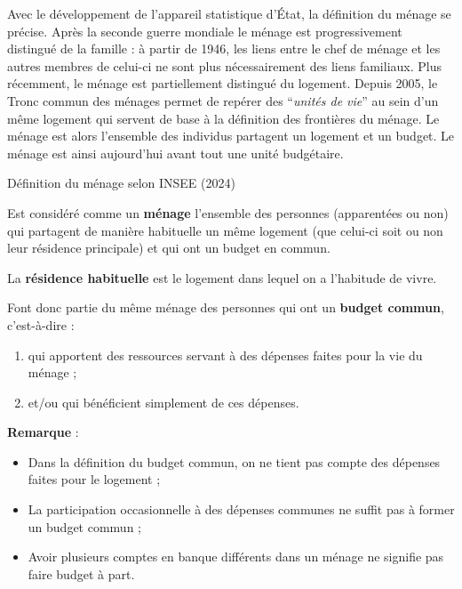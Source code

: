 \documentclass[
  12pt,
]{book}
\begin{document}
Avec le développement de l'appareil statistique d'État, la définition du
ménage se précise. Après la seconde guerre mondiale le ménage est
progressivement distingué de la famille : à partir de 1946, les liens
entre le chef de ménage et les autres membres de celui-ci ne sont plus
nécessairement des liens familiaux. Plus récemment, le ménage est
partiellement distingué du logement. Depuis 2005, le Tronc commun des
ménages permet de repérer des ``\emph{unités de vie}'' au sein d'un même
logement qui servent de base à la définition des frontières du ménage.
Le ménage est alors l'ensemble des individus partagent un logement et un
budget. Le ménage est ainsi aujourd'hui avant tout une unité budgétaire.

\begin{encadre}{Définition du ménage selon INSEE (2024)}

Est considéré comme un \textbf{ménage} l'ensemble des personnes (apparentées ou non) qui partagent de manière habituelle un même logement (que celui-ci soit ou non leur résidence principale) et qui ont un budget en commun.

La \textbf{résidence habituelle} est le logement dans lequel on a l'habitude de vivre.

Font donc partie du même ménage des personnes qui ont un \textbf{budget commun}, c'est-à-dire :

\begin{enumerate}

\item{qui apportent des ressources servant à des dépenses faites pour la vie du ménage ;}

\item{et/ou qui bénéficient simplement de ces dépenses.}

\end{enumerate}

\tcblower

\textbf{Remarque} : 

\begin{itemize}

\item{Dans la définition du budget commun, on ne tient pas compte des dépenses faites pour le logement ;}

\item{La participation occasionnelle à des dépenses communes ne suffit pas à former un budget commun ;}

\item{Avoir plusieurs comptes en banque différents dans un ménage ne signifie pas faire budget à part.}

\end{itemize}

\end{encadre}
\end{document}
